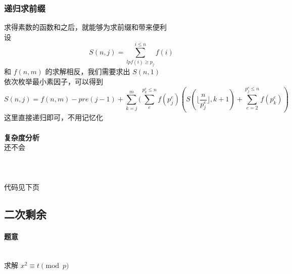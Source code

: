 	\subsubsection{递归求前缀}
	求得素数的函数和之后，就能够为求前缀和带来便利\\
	设
	$$
	S(n,j)=\sum_{lpf(i)\ge p_j}^{i\le n} f(i)
	$$
	和 $f(n,m)$ 的求解相反，我们需要求出 $S(n,1)$\\
	依次枚举最小素因子，可以得到
	$$
	S(n,j)=f(n,m)-pre(j-1)+\sum_{k=j}^m(\sum_e^{p_k^e\le n}f(p_j^e)(S(\lfloor\frac{n}{p_j^e}\rfloor,k+1)+\sum_{e=2}^{p_j^e\le n}f(p_k^e))
	$$
	这里直接递归即可，不用记忆化\\
	~\\
	\textbf{\large 复杂度分析}\\
	还不会\\
	~\\
	~\\
	~\\
	代码见下页
	\newpage
	
	\newpage
	\subsection{二次剩余}
	\paragraph{题意}~\\
	求解 $x^2\equiv t\pmod p$\\
